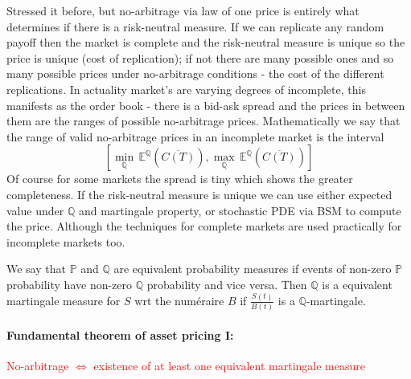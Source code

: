 \documentclass[9pt]{extarticle}
\begin{document}
Stressed it before, but no-arbitrage via law of one price is entirely what determines 
if there is a risk-neutral measure. If we can replicate any random payoff 
then the market is complete and the risk-neutral measure is unique so the price 
is unique (cost of replication); if not there 
are many possible ones and so many possible prices under no-arbitrage conditions - the cost 
of the different replications. In actuality market's are varying degrees of incomplete, this manifests as 
the order book - there is a bid-ask spread and the prices in between them are the ranges of possible no-arbitrage prices. Mathematically we say that 
the range of valid no-arbitrage prices in an incomplete market is the interval 
$$\left[\underset{\mathbb{Q}}{\operatorname{min}}\,\mathbb{E}^{\mathbb{Q}}(\overline{C(T)}),\underset{\mathbb{Q}}{\operatorname{max}}\,\mathbb{E}^{\mathbb{Q}}(\overline{C(T)}) \right]$$ 
Of course
for some markets the spread is tiny which shows the greater completeness. If the risk-neutral measure is unique we can use either expected 
value under $\mathbb{Q}$ and martingale property, or stochastic PDE via BSM to compute the price. Although the techniques for complete markets 
are used practically for incomplete markets too.


We say that $\mathbb{P}$ and $\mathbb{Q}$ are equivalent probability measures if events of non-zero $\mathbb{P}$ probability 
have non-zero $\mathbb{Q}$ probability and vice versa. Then $\mathbb{Q}$ is a equivalent martingale measure for $S$ wrt the 
num\'eraire $B$ if $\frac{S(t)}{B(t)}$ is a $\mathbb{Q}$-martingale. 


\paragraph{Fundamental theorem of asset pricing I:} \textcolor{red}{No-arbitrage $\iff$ existence of at least one equivalent martingale measure}
\end{document}

